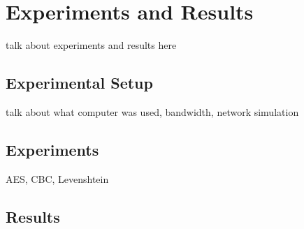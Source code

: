 \chapter{Experiments and Results}

talk about experiments and results here

\section{Experimental Setup}
talk about what computer was used, bandwidth, network simulation

\section{Experiments}
AES, CBC, Levenshtein

\section{Results}
